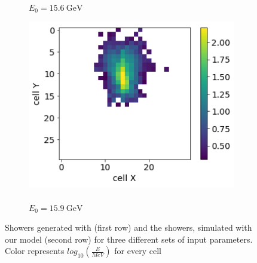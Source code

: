\begin{figure}
\begin{subfigure}{0.24\textwidth}
    \caption{\\$E_0 = 15.6~\text{GeV}$ }%
  \end{subfigure}
  \begin{subfigure}{0.24\textwidth}
    \centering
    \includegraphics[width=1\textwidth]{figures/4_gen.png}
    \caption{\\$E_0 = 15.9~\text{GeV}$ }%
  \end{subfigure}
 
  \caption{Showers generated with \geant (first row) and the showers,
    simulated with our model (second row) for three different sets of
    input parameters. Color represents $log_{10}(\frac{E}{MeV})$ for every cell}
  \label{fig:geant_vs_ours}
\end{figure}


